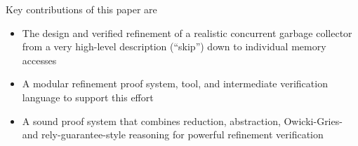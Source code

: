 Key contributions of this paper are 
\begin{itemize}
\item The design and verified refinement of a realistic concurrent garbage collector from a very high-level description (``skip'') down to individual memory accesses
\item A modular refinement proof system, tool, and intermediate verification language to support this effort
\item A sound proof system that combines reduction, abstraction, Owicki-Gries- and rely-guarantee-style reasoning for powerful refinement verification
\end{itemize}


